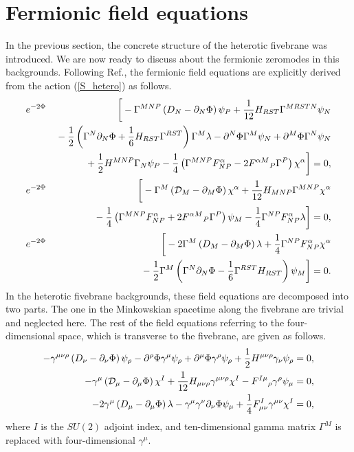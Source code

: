 \documentclass[a4paper,aps, amssymb, preprint, 12pt]{revtex4}
\begin{document}
\section{Fermionic field equations}
\label{sec:three}
In the previous section, the concrete structure of the heterotic fivebrane was introduced.
We are now ready to discuss about the fermionic zeromodes in this backgrounds.
Following Ref.\cite{Bellisai}, the fermionic field equations are explicitly derived from the action (\ref{S_hetero}) as follows.
\begin{eqnarray}
e^{-2\Phi}&&\bigg[-\Gamma^{MNP}\left(D_N-\partial_N\Phi\right)\psi_P
+\frac{1}{12}H_{RST}\Gamma^{MRSTN}\psi_N \nonumber \\
&&{}-\frac{1}{2}\left(\Gamma^N\partial_N\Phi+\frac{1}{6}H_{RST}\Gamma^{RST}\right)\Gamma^M\lambda
-\partial^N\Phi\Gamma^M\psi_N+\partial^M\Phi\Gamma^N\psi_N \nonumber \\
&&{}+\frac{1}{2}H^{MNP}\Gamma_N\psi_P
-\frac{1}{4}\left(\Gamma^{MNP}F^\alpha_{NP}-2{F^{\alpha M}}_P\Gamma^P\right)\chi^\alpha\bigg]=0,\\
e^{-2\Phi}&&\bigg[-\Gamma^M\left({\cal D}_M-\partial_M\Phi\right)\chi^\alpha
+\frac{1}{12}H_{MNP}\Gamma^{MNP}\chi^\alpha \nonumber \\
&&{}-\frac{1}{4}\left(\Gamma^{MNP}F^\alpha_{NP}+2{F^{\alpha M}}_P\Gamma^P\right)\psi_M
-\frac{1}{4}\Gamma^{NP}F^{\alpha}_{NP}\lambda \bigg]=0,\\
e^{-2\Phi}&&\bigg[-2\Gamma^M\left(D_M-\partial_M\Phi\right)\lambda
+\frac{1}{4}\Gamma^{NP}F^{\alpha}_{NP}\chi^\alpha \nonumber \\
&&{}-\frac{1}{2}\Gamma^M\left(\Gamma^N\partial_N\Phi-\frac{1}{6}\Gamma^{RST}H_{RST}\right)\psi_M\bigg]=0.
\end{eqnarray}
In the heterotic fivebrane backgrounds, these field equations are decomposed into two parts.
The one in the Minkowskian spacetime along the fivebrane are trivial and neglected here.
The rest of the field equations referring to the four-dimensional space, which is transverse to the fivebrane, are given as follows.
\begin{eqnarray}
-\gamma^{\mu\nu\rho}\left(D_\nu-\partial_\nu\Phi\right)\psi_\rho
-\partial^\rho\Phi\gamma^\mu\psi_\rho
+\partial^\mu\Phi\gamma^\rho\psi_\rho
+\frac{1}{2}H^{\mu\nu\rho}\gamma_\nu\psi_\rho=0, \label{gravitino_eq} \\
-\gamma^\mu\left({\cal D}_\mu-\partial_\mu\Phi\right)\chi^I
+\frac{1}{12}H_{\mu\nu\rho}\gamma^{\mu\nu\rho}\chi^I
-{F^{I\mu}}_\rho\gamma^\rho\psi_\mu=0, \label{gaugino_eq} \\
-2\gamma^\mu\left(D_\mu-\partial_\mu\Phi\right)\lambda
-\gamma^\mu\gamma^\nu\partial_\nu\Phi\psi_\mu
+\frac{1}{4}F^I_{\mu\nu}\gamma^{\mu\nu}\chi^I=0, \label{dilatino_eq}
\end{eqnarray}
where $I$ is the $SU(2)$ adjoint index, and ten-dimensional gamma matrix $\Gamma^M$ is replaced with four-dimensional $\gamma^\mu$.
\end{document}
